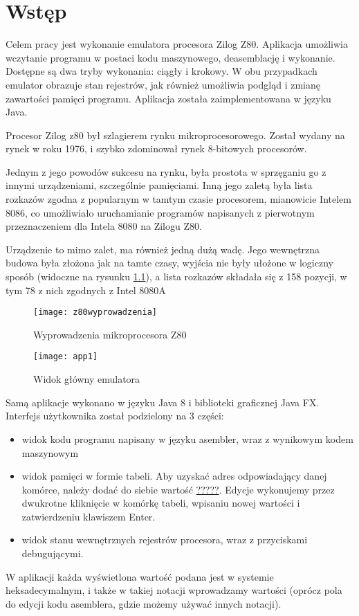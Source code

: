 \chapter{Wstęp}

	Celem pracy jest wykonanie emulatora procesora Zilog Z80. Aplikacja umożliwia wczytanie programu w postaci kodu maszynowego, deasemblację i wykonanie. Dostępne są dwa tryby wykonania: ciągły i krokowy. W obu przypadkach emulator obrazuje stan rejestrów, jak również umożliwia podgląd i zmianę zawartości pamięci programu. Aplikacja została zaimplementowana w języku Java.
	
	Procesor Zilog z80 był szlagierem rynku mikroprocesorowego. \cite{karczmarczuk}
	Został wydany na rynek w roku 1976, i szybko zdominował rynek 8-bitowych procesorów.
	
	Jednym z jego powodów sukcesu na rynku, była prostota w sprzęganiu go z innymi urządzeniami, szczególnie pamięciami. Inną jego zaletą była lista rozkazów zgodna z popularnym w tamtym czasie procesorem, mianowicie Intelem 8086, co umożliwiało uruchamianie programów napisanych z pierwotnym przeznaczeniem dla Intela 8080 na Zilogu Z80. \cite{karczmarczuk}
	
	Urządzenie to mimo zalet, ma również jedną dużą wadę. Jego wewnętrzna budowa była złożona jak na tamte czasy, wyjścia nie były ułożone w logiczny sposób (widoczne na rysunku  \ref{img:z80wyprowadzenia}), a lista rozkazów składała się z 158 pozycji, w tym 78 z nich zgodnych z Intel 8080A \cite{manual}
	
	
	\begin{figure}[h]
		\centering
		\texttt{[image: z80wyprowadzenia]}
		\caption{Wyprowadzenia mikroprocesora Z80}
		\label{img:z80wyprowadzenia}
	\end{figure}
			
	\begin{figure}[h]		
		\centering
		\texttt{[image: app1]}
		\caption{Widok główny emulatora}
	\end{figure}
	
	Samą aplikacje wykonano w języku Java 8 i biblioteki graficznej Java FX. 
	Interfejs użytkownika został podzielony na 3 części: 
	\begin{itemize}  
		\item widok kodu programu napisany w języku asembler, wraz z  wynikowym kodem maszynowym  
		\item widok pamięci w formie tabeli. Aby uzyskać adres odpowiadający danej komórce, należy dodać do siebie wartość \underline{?????}. Edycje wykonujemy przez dwukrotne kliknięcie w komórkę tabeli, wpisaniu nowej wartości i zatwierdzeniu klawiszem Enter.
		\item widok stanu wewnętrznych rejestrów procesora, wraz z przyciskami debugującymi.   
	\end{itemize}
	
	W aplikacji każda wyświetlona wartość podana jest w systemie heksadecymalnym, i także w takiej notacji wprowadzamy wartości (oprócz pola do edycji kodu asemblera, gdzie możemy używać innych notacji).
	